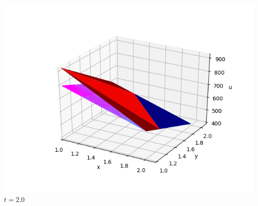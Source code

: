 \documentclass[]{beamer}
\begin{document}
\begin{frame}[t]
\begin{columns}
\begin{center}
			\includegraphics[scale=0.2]{figures/2D_rz_ls1mat_u_vs_x_20}\\
			$t=2.0$
			\end{center}
	\end{columns}
\end{frame}
\end{document}
